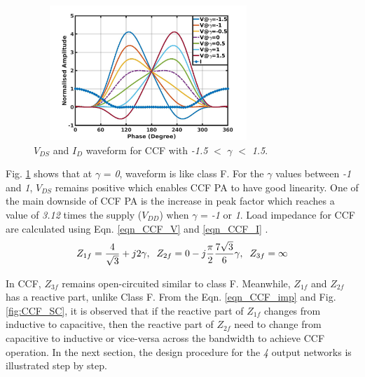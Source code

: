 \documentclass[conference]{IEEEtran}
\begin{document}
\begin{figure}[!t]
\centering
\captionsetup{font=footnotesize}
\includegraphics[width=3.4in, height=2in]{Images/CCF/CCF_wave_VI.jpg}
\caption{$V_{DS}$ and $I_D$ waveform for CCF with \textit{-1.5} $<$ $\gamma$ $<$ \textit{1.5}.}
\label{fig:CCF_wave_VI}
\vspace{-0.25in}
\end{figure}

Fig. \ref{fig:CCF_wave_VI} shows that at $\gamma$ = \textit{0}, waveform is like class F. For the $\gamma$ values between \textit{-1} and \textit{1}, $V_{DS}$ remains positive which enables CCF PA to have good linearity. One of the main downside of CCF PA is the increase in peak factor which reaches a value of \textit{3.12} times the supply ($V_{DD}$) when $\gamma$ = \textit{-1} or \textit{1}. 
Load impedance for CCF are calculated using Eqn. \ref{eqn_CCF_V} and \ref{eqn_CCF_I} \cite{CCFDesign_ali}.
\begin{equation}
\begin{aligned}
Z_{1f}=\frac{4}{\sqrt{3}}+j 2 \gamma, \hspace{2mm}
Z_{2f}=0-j \frac{\pi}{2} \frac{7 \sqrt{3}}{6} \gamma,\hspace{2mm}
Z_{3f}=\infty
\label{eqn_CCF_imp}
\end{aligned}
\end{equation}

In CCF, $Z_{3f}$ remains open-circuited similar to class F. Meanwhile, $Z_{1f}$ and $Z_{2f}$ has a reactive part, unlike Class F. From the Eqn. \ref{eqn_CCF_imp} and Fig. \ref{fig:CCF_SC}, it is observed that if the reactive part of $Z_{1f}$ changes from inductive to capacitive, then the reactive part of $Z_{2f}$ need to change from capacitive to inductive or vice-versa across the bandwidth to achieve CCF operation. In the next section, the design procedure for the \textit{4} output networks is illustrated step by step.
\end{document}
